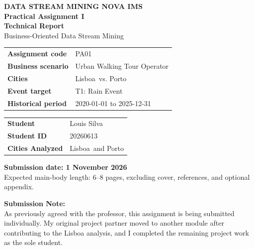 \documentclass[11pt,a4paper]{article}
\newcommand{\AssignmentCode}{PA01}
\newcommand{\StudentA}{Louis Silva}
\newcommand{\StudentAID}{20260613}
\newcommand{\CityA}{Lisboa}
\newcommand{\CityB}{Porto}
\newcommand{\BusinessScenario}{Urban Walking Tour Operator}
\newcommand{\EventTarget}{T1: Rain Event}
\newcommand{\HistoricalPeriod}{2020-01-01 to 2025-12-31}
\newcommand{\SubmissionDate}{1 November 2026}
\newif\ifdraftinstructions
\begin{document}
	
	\begin{titlepage}
		\pagecolor{Navy}
		\color{white}
		\vspace*{1.25cm}
		{\small\bfseries\color{Mint}\MakeUppercase{Data Stream Mining \;\textbullet\; NOVA IMS}}\\[0.85cm]
		{\Huge\bfseries Practical Assignment I}\\[0.30cm]
		{\fontsize{25}{29}\selectfont\bfseries Technical Report}\\[0.55cm]
		{\Large\color{Mint}Business-Oriented Data Stream Mining}\\[1.05cm]
		
		\begin{tcolorbox}[colback=white!7!Navy,colframe=Mint,boxrule=0.8pt,arc=2mm,left=5mm,right=5mm,top=4mm,bottom=4mm]
			\color{white}
			\begin{tabularx}{\textwidth}{@{}L{4.3cm}Y@{}}
				\textbf{Assignment code} & \AssignmentCode \\
				\textbf{Business scenario} & \BusinessScenario \\
				\textbf{Cities} & \CityA\ vs. \CityB \\
				\textbf{Event target} & \EventTarget \\
				\textbf{Historical period} & \HistoricalPeriod \\
			\end{tabularx}
		\end{tcolorbox}
		
		\vspace{0.75cm}
		\begin{tabularx}{\textwidth}{@{}L{4.3cm}Y@{}}
			\textbf{Student} & \StudentA \\
			\textbf{Student ID} & \StudentAID \\
			\textbf{Cities Analyzed} & \CityA\ and \CityB \\
		\end{tabularx}
		
		\vfill
		{\large\bfseries Submission date: \SubmissionDate}\\[0.15cm]
		{\normalsize\color{white!75}Expected main-body length: 6--8 pages, excluding cover, references, and optional appendix.}
		
		\ifdraftinstructions
		\vspace{0.55cm}
		{\small\bfseries\color{Mint}TEMPLATE MODE - WRITING GUIDANCE IS CURRENTLY VISIBLE}
		\fi
		\vspace*{0.55cm}
		
		{\large\bfseries Submission Note:}\\[0.15cm]
		{\normalsize\color{white!75}As previously agreed with the professor, this assignment is being
			submitted individually. My original project partner moved to another
			module after contributing to the Lisboa analysis, and I completed
			the remaining project work as the sole student.}
		
	\end{titlepage}
	\nopagecolor
	\color{BodyText}
	\setcounter{page}{1}
	
\end{document}
